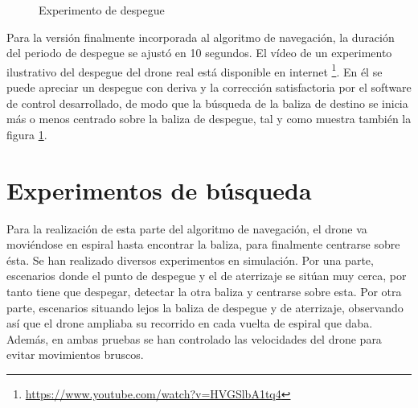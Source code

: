 \begin{figure}[H]
 \centering
 \caption{Experimento de despegue}
 \label{f:Test_Despegue}
\end{figure}

Para la versi\'on finalmente incorporada al algoritmo de navegaci\'on, la duraci\'on del periodo de despegue se ajust\'o en 10 segundos. 
El v\'ideo de un experimento ilustrativo del despegue del drone real est\'a disponible en internet \footnote{\url{https://www.youtube.com/watch?v=HVGSlbA1tq4}}. En \'el se puede apreciar un despegue con deriva y la correcci\'on satisfactoria por el software de control desarrollado, de modo que la b\'usqueda de la baliza de destino se inicia m\'as o menos centrado sobre la baliza de despegue, tal y como muestra tambi\'en la figura \ref{f:Test_Despegue}. 

\section{Experimentos de b\'usqueda }

\hspace{1cm} Para la realizaci\'on de esta parte del algoritmo de navegaci\'on, el drone va movi\'endose en espiral hasta encontrar la baliza, para finalmente centrarse sobre \'esta. Se han realizado diversos experimentos en simulaci\'on. Por una parte, escenarios donde el punto de despegue y el de aterrizaje se sit\'uan muy cerca, por tanto tiene que despegar, detectar la otra baliza y centrarse sobre esta. Por otra parte, escenarios situando lejos la baliza de despegue y de aterrizaje, observando as\'i que el drone ampliaba su recorrido en cada vuelta de espiral que daba. Adem\'as, en ambas pruebas se han controlado las velocidades del drone para evitar movimientos bruscos. 

